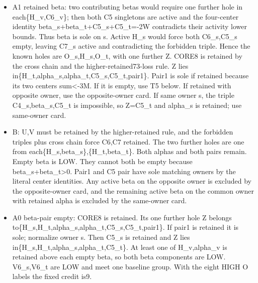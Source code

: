 \documentclass[10pt,a4paper]{article}
\theoremstyle{definition}
\providecommand{\tightlist}{\setlength{\itemsep}{0pt}\setlength{\parskip}{0pt}}
\begin{document}
\begin{itemize}
\tightlist
\item
  A1 retained beta: two contributing betas would require one further
  hole in each\{H\_\allowbreak{}v,\allowbreak{}C6\_\allowbreak{}v\}; then both C5 singletons are active and the
  four-center identity beta\_\allowbreak{}s+\allowbreak{}beta\_\allowbreak{}t+\allowbreak{}C5\_\allowbreak{}s+\allowbreak{}C5\_\allowbreak{}t=\allowbreak{}-2W contradicts their
  activity lower bounds. Thus beta is sole on s. Active H\_\allowbreak{}s would force
  both C6\_\allowbreak{}s,\allowbreak{}C5\_\allowbreak{}s empty,\allowbreak{} leaving C7\_\allowbreak{}s active and contradicting the
  forbidden triple. Hence the known holes are O\_\allowbreak{}s,\allowbreak{}H\_\allowbreak{}s,\allowbreak{}O\_\allowbreak{}t,\allowbreak{} with one
  further Z. CORE8 is retained by the cross chain and the
  higher-retained73-loss rule. Z lies
  in\{H\_\allowbreak{}t,\allowbreak{}alpha\_\allowbreak{}s,\allowbreak{}alpha\_\allowbreak{}t,\allowbreak{}C5\_\allowbreak{}s,\allowbreak{}C5\_\allowbreak{}t,\allowbreak{}pair1\}. Pair1 is sole if
  retained because its two centers sum\textless-3M. If it is empty,\allowbreak{} use
  T5 below. If retained with opposite owner,\allowbreak{} use the opposite-owner
  card. If same owner s,\allowbreak{} the triple C4\_\allowbreak{}s,\allowbreak{}beta\_\allowbreak{}s,\allowbreak{}C5\_\allowbreak{}t is impossible,\allowbreak{}
  so Z=\allowbreak{}C5\_\allowbreak{}t and alpha\_\allowbreak{}s is retained; use same-owner card.
\item
  B: U,\allowbreak{}V must be retained by the higher-retained rule,\allowbreak{} and the forbidden
  triples plus cross chain force C6,\allowbreak{}C7 retained. The two further holes
  are one from each\{H\_\allowbreak{}s,\allowbreak{}beta\_\allowbreak{}s\},\allowbreak{}\{H\_\allowbreak{}t,\allowbreak{}beta\_\allowbreak{}t\}. Both alphas and
  both pairs remain. Empty beta is LOW. They cannot both be empty
  because beta\_\allowbreak{}s+\allowbreak{}beta\_\allowbreak{}t\textgreater0. Pair1 and C5 pair have sole
  matching owners by the literal center identities. Any active beta on
  the opposite owner is excluded by the opposite-owner card,\allowbreak{} and the
  remaining active beta on the common owner with retained alpha is
  excluded by the same-owner card.
\item
  A0 beta-pair empty: CORE8 is retained. Its one further hole Z belongs
  to\{H\_\allowbreak{}s,\allowbreak{}H\_\allowbreak{}t,\allowbreak{}alpha\_\allowbreak{}s,\allowbreak{}alpha\_\allowbreak{}t,\allowbreak{}C5\_\allowbreak{}s,\allowbreak{}C5\_\allowbreak{}t,\allowbreak{}pair1\}. If pair1 is
  retained it is sole; normalize owner s. Then C5\_\allowbreak{}s is retained and Z
  lies in\{H\_\allowbreak{}s,\allowbreak{}H\_\allowbreak{}t,\allowbreak{}alpha\_\allowbreak{}s,\allowbreak{}alpha\_\allowbreak{}t,\allowbreak{}C5\_\allowbreak{}t\}. At least one of
  H\_\allowbreak{}v,\allowbreak{}alpha\_\allowbreak{}v is retained above each empty beta,\allowbreak{} so both beta
  components are LOW. V6\_\allowbreak{}s,\allowbreak{}V6\_\allowbreak{}t are LOW and meet one baseline group.
  With the eight HIGH O labels the fixed credit is9.
\end{itemize}
\end{document}

